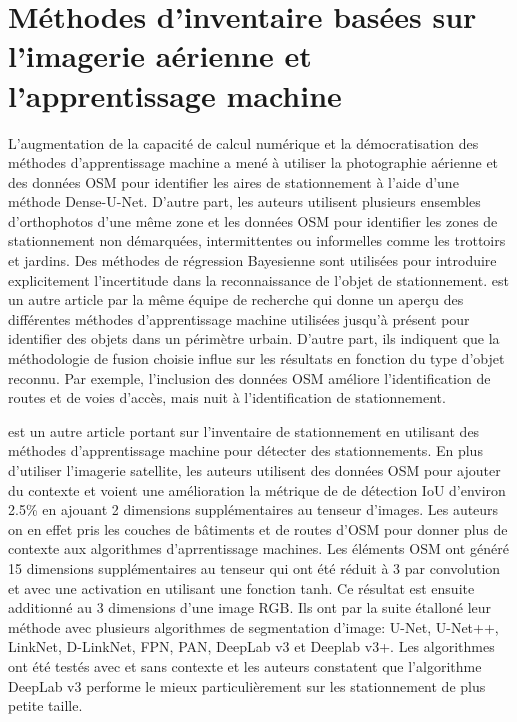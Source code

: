 \section{Méthodes d'inventaire basées sur l'imagerie aérienne et l'apprentissage machine}
  L'augmentation de la capacité de calcul numérique et la démocratisation des méthodes d'apprentissage machine a mené \textcite{Hellekes:ParkingSpace:2023} à utiliser la photographie aérienne et des données \ac{OSM} pour identifier les aires de stationnement à l'aide d'une méthode Dense-U-Net. D'autre part, les auteurs utilisent plusieurs ensembles d'orthophotos d'une même zone et les données \ac{OSM} pour identifier les zones de stationnement non démarquées, intermittentes ou informelles comme les trottoirs et jardins. Des méthodes de régression Bayesienne sont utilisées pour introduire explicitement l'incertitude dans la reconnaissance de l'objet de stationnement. \textcite{Henry:CitywideEstimation:2021} est un autre article par la même équipe de recherche qui donne un aperçu des différentes méthodes d'apprentissage machine utilisées jusqu'à présent pour identifier des objets dans un périmètre urbain. D'autre part, ils indiquent que la méthodologie de fusion choisie influe sur les résultats en fonction du type d'objet reconnu. Par exemple, l'inclusion des données \ac{OSM} améliore l'identification de routes et de voies d'accès, mais nuit à l'identification de stationnement.  \par
  \textcite{Yin:ContextenrichedSatellite:2022} est un autre article portant sur l'inventaire de stationnement en utilisant des méthodes d'apprentissage machine pour détecter des stationnements. En plus d'utiliser l'imagerie satellite, les auteurs utilisent des données \ac{OSM} pour ajouter du contexte et voient une amélioration la métrique de de détection \ac{IoU} d'environ 2.5\% en ajouant 2 dimensions supplémentaires au tenseur d'images. Les auteurs on en effet pris les couches de bâtiments et de routes d'\ac{OSM} pour donner plus de contexte aux algorithmes d'aprrentissage machines. Les éléments OSM ont généré 15 dimensions supplémentaires au tenseur qui ont été réduit à 3 par convolution et avec une activation en utilisant une fonction tanh. Ce résultat est ensuite additionné au 3 dimensions d'une image RGB. Ils ont par la suite étalloné leur méthode avec plusieurs algorithmes de segmentation d'image: U-Net, U-Net++, LinkNet, D-LinkNet, FPN, PAN, DeepLab v3 et Deeplab v3+. Les algorithmes ont été testés avec et sans contexte et les auteurs constatent que l'algorithme DeepLab v3 performe le mieux particulièrement sur les stationnement de plus petite taille.
